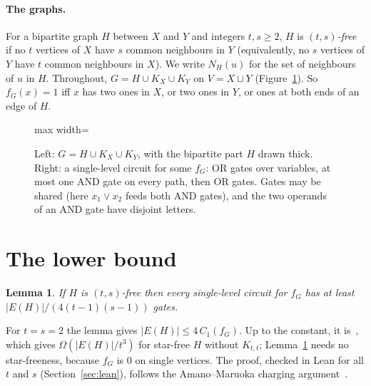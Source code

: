 \documentclass[11pt]{article}
\newtheorem{lemma}[theorem]{Lemma}
\theoremstyle{definition}
\theoremstyle{remark}
\newcommand{\Cone}{C_1}
\begin{document}
\paragraph{The graphs.} For a bipartite graph $H$ between $X$ and $Y$ and integers $t,s\ge 2$, $H$ is
\emph{$(t,s)$-free} if no $t$ vertices of $X$ have $s$ common neighbours in $Y$ (equivalently, no $s$ vertices of $Y$
have $t$ common neighbours in $X$). We write $N_H(u)$ for the set of neighbours of $u$ in $H$. Throughout,
$G=H\cup K_X\cup K_Y$ on $V=X\sqcup Y$ (Figure~\ref{fig:setup}). So $f_G(x)=1$ iff $x$ has two ones in $X$, or two
ones in $Y$, or ones at both ends of an edge of $H$.

\begin{figure}[t]
\centering
\begin{adjustbox}{max width=\linewidth}

\end{adjustbox}
\caption{Left: $G=H\cup K_X\cup K_Y$, with the bipartite part $H$ drawn thick. Right: a single-level circuit for some
$f_G$: OR gates over variables, at most one AND gate on every path, then OR gates. Gates may be shared (here
$x_1\vee x_2$ feeds both AND gates), and the two operands of an AND gate have disjoint letters.}\label{fig:setup}
\end{figure}

\section{The lower bound}

\begin{lemma}\label{lem:lower}
If $H$ is $(t,s)$-free then every single-level circuit for $f_G$ has at least $|E(H)|/(4(t-1)(s-1))$ gates.
\end{lemma}

For $t=s=2$ the lemma gives $|E(H)|\le 4\,\Cone(f_G)$. Up to the constant, it is~\cite[Lemma~3.13]{Juk06}, which
gives $\Omega(|E(H)|/t^3)$ for star-free $H$ without $K_{t,t}$; Lemma~\ref{lem:lower} needs no star-freeness, because
$f_G$ is $0$ on single vertices. The proof, checked in Lean for all $t$ and $s$ (Section~\ref{sec:lean}), follows the Amano--Maruoka charging
argument~\cite{AM06}.
\end{document}
